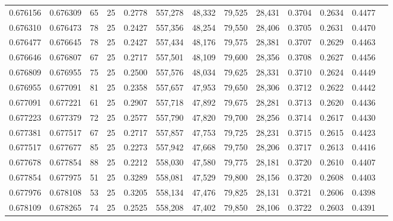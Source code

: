 \begin{tabular}{rrrrrrrrrrrrr}
0.676156 & 0.676309 &    65 &  25 &                                     0.2778 & 557,278 &  48,332 &  79,525 &  28,431 & 0.3704 & 0.2634 & 0.4477 \\
0.676310 & 0.676473 &    78 &  25 &                                     0.2427 & 557,356 &  48,254 &  79,550 &  28,406 & 0.3705 & 0.2631 & 0.4470 \\
0.676477 & 0.676645 &    78 &  25 &                                     0.2427 & 557,434 &  48,176 &  79,575 &  28,381 & 0.3707 & 0.2629 & 0.4463 \\
0.676646 & 0.676807 &    67 &  25 &                                     0.2717 & 557,501 &  48,109 &  79,600 &  28,356 & 0.3708 & 0.2627 & 0.4456 \\
0.676809 & 0.676955 &    75 &  25 &                                     0.2500 & 557,576 &  48,034 &  79,625 &  28,331 & 0.3710 & 0.2624 & 0.4449 \\
0.676955 & 0.677091 &    81 &  25 &                                     0.2358 & 557,657 &  47,953 &  79,650 &  28,306 & 0.3712 & 0.2622 & 0.4442 \\
0.677091 & 0.677221 &    61 &  25 &                                     0.2907 & 557,718 &  47,892 &  79,675 &  28,281 & 0.3713 & 0.2620 & 0.4436 \\
0.677223 & 0.677379 &    72 &  25 &                                     0.2577 & 557,790 &  47,820 &  79,700 &  28,256 & 0.3714 & 0.2617 & 0.4430 \\
0.677381 & 0.677517 &    67 &  25 &                                     0.2717 & 557,857 &  47,753 &  79,725 &  28,231 & 0.3715 & 0.2615 & 0.4423 \\
0.677517 & 0.677677 &    85 &  25 &                                     0.2273 & 557,942 &  47,668 &  79,750 &  28,206 & 0.3717 & 0.2613 & 0.4416 \\
0.677678 & 0.677854 &    88 &  25 &                                     0.2212 & 558,030 &  47,580 &  79,775 &  28,181 & 0.3720 & 0.2610 & 0.4407 \\
0.677854 & 0.677975 &    51 &  25 &                                     0.3289 & 558,081 &  47,529 &  79,800 &  28,156 & 0.3720 & 0.2608 & 0.4403 \\
0.677976 & 0.678108 &    53 &  25 &                                     0.3205 & 558,134 &  47,476 &  79,825 &  28,131 & 0.3721 & 0.2606 & 0.4398 \\
0.678109 & 0.678265 &    74 &  25 &                                     0.2525 & 558,208 &  47,402 &  79,850 &  28,106 & 0.3722 & 0.2603 & 0.4391 \\

\end{tabular}

